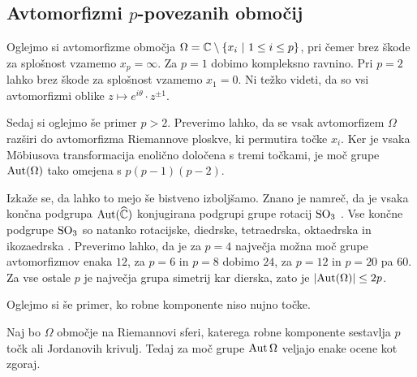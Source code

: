 

\subsection{Avtomorfizmi \texorpdfstring{$p$}{p}-povezanih območij}

Oglejmo si avtomorfizme območja
$\Omega = \mathbb{C} \setminus \left\{x_i~\middle\vert~1 \leq i \leq p\right\}$, pri čemer
brez škode za splošnost vzamemo $x_p = \infty$. Za $p = 1$ dobimo
kompleksno ravnino. Pri $p = 2$ lahko brez škode za splošnost
vzamemo $x_1 = 0$. Ni težko videti, da so vsi avtomorfizmi oblike
$z \mapsto e^{i \theta} \cdot z^{\pm 1}$.

Sedaj si oglejmo še primer $p > 2$. Preverimo lahko, da se vsak
avtomorfizem $\Omega$ razširi do avtomorfizma Riemannove ploskve,
ki permutira točke $x_i$. Ker je vsaka Möbiusova transformacija
enolično določena s tremi točkami, je moč grupe $\operatorname{Aut}(\Omega)$ tako
omejena s $p (p-1) (p-2)$.

Izkaže se, da lahko to mejo še bistveno izboljšamo. Znano je
namreč, da je vsaka končna podgrupa $\operatorname{Aut}(\widehat{\mathbb{C}})$ konjugirana
podgrupi grupe rotacij $\operatorname{SO}_3$ \cite{Lyndol}. Vse končne podgrupe
$\operatorname{SO}_3$ so natanko rotacijske, diedrske, tetraedrska, oktaedrska in
ikozaedrska \cite{Artin_1991}. Preverimo lahko, da je za $p = 4$
največja možna moč grupe avtomorfizmov enaka $12$, za $p = 6$ in
$p = 8$ dobimo $24$, za $p = 12$ in $p = 20$ pa $60$. Za vse ostale
$p$ je največja grupa simetrij kar dierska, zato je
$\left\lvert \operatorname{Aut}(\Omega)\right\rvert \leq 2p$.


Oglejmo si še primer, ko robne komponente niso nujno točke.

\begin{izrek}
Naj bo $\Omega$ območje na Riemannovi sferi, katerega robne
komponente sestavlja $p$ točk ali Jordanovih krivulj. Tedaj za
moč grupe $\operatorname{Aut} \Omega$ veljajo enake ocene kot zgoraj.
\end{izrek}

